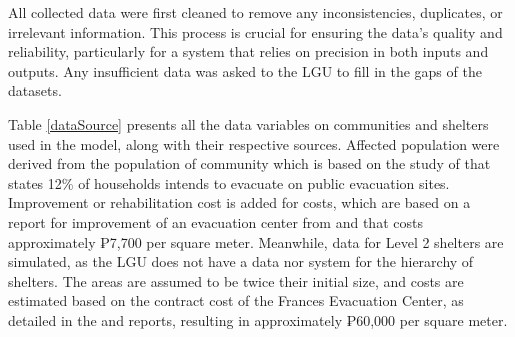 	All collected data were first cleaned to remove any inconsistencies, duplicates, or irrelevant information. This process is crucial for ensuring the data’s quality and reliability, particularly for a system that relies on precision in both inputs and outputs. Any insufficient data was asked to the LGU to fill in the gaps of the datasets. 
	
	Table \ref{dataSource} presents all the data variables on communities and shelters used in the model, along with their respective sources. Affected population were derived from the population of community which is based on the study of \textcite{Opdyke2024} that states 12\% of households intends to evacuate on public evacuation sites. Improvement or rehabilitation cost is added for costs, which are based on a report for improvement of an evacuation center from \textcite{DilgL1area2022} and \textcite{DilgL1cost2022} that costs approximately ₱7,700 per square meter. Meanwhile, data for Level 2 shelters are simulated, as the LGU does not have a data nor system for the hierarchy of shelters. The areas are assumed to be twice their initial size, and costs are estimated based on the contract cost of the Frances Evacuation Center, as detailed in the \textcite{DilgL22022} and \textcite{Dpwh2022} reports, resulting in approximately ₱60,000 per square meter. 
	

